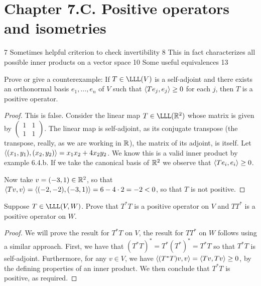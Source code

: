 \section*{Chapter 7.C. Positive operators and isometries}


7 Sometimes helpful criterion to check invertibility
8 This in fact characterizes all possible inner products on a vector space
10 Some useful equivalences
13 

\begin{exercise}{1}
  Prove or give a counterexample: If $T\in\LLL(V)$ is a self-adjoint and there exists an orthonormal basis $e_1,\dots,e_n$ of $V$ such that $\langle Te_j,e_j\rangle\geq 0$ for each $j$, then $T$ is a positive operator.
\end{exercise}
\begin{proof}
 This is false. Consider the linear map $T\in\LLL(\R^2)$ whose matrix is given by
 $\begin{pmatrix}
     1 & 1\\
     1 & 1
 \end{pmatrix}$.
 The linear map is self-adjoint, as its conjugate transpose (the transpose, really, as we are working in $\mathbb{R}$), the matrix of its adjoint, is itself. Let $\langle (x_1,y_1),(x_2,y_2)\rangle=x_1x_2+4x_2y_2$. We know this is a valid inner product by example 6.4.b. If we take the canonical basis of $\mathbb{R}^2$ we observe that $\langle Te_i,e_i\rangle\geq 0$. 

 Now take $v=(-3,1)\in\mathbb{R}^2$, so that $\langle Tv,v\rangle =\langle (-2,-2),(-3,1)\rangle =6-4\cdot 2 =-2<0$, so that $T$ is not positive.
\end{proof}

\begin{exercise}{4}
  Suppose $T\in\LLL(V,W)$. Prove that $T^\ast T$ is a positive operator on $V$ and $TT^\ast$ is a positive operator on $W$.
\end{exercise}
\begin{proof}
 We will prove the result for $T^\ast T$ on $V$, the result for $TT^\ast$ on $W$ follows using a similar approach. First, we have that $(T^\ast T)^\ast =T^\ast (T^\ast)^\ast = T^\ast T$ so that $T^\ast T$ is self-adjoint. Furthermore, for any $v\in V$, we have $\langle (T^\ast T)v,v\rangle =\langle Tv,Tv\rangle\geq 0$, by the defining properties of an inner product. We then conclude that $T^\ast T$ is positive, as required.
\end{proof}

